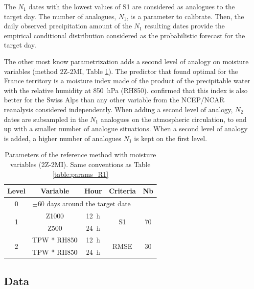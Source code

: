 \documentclass[5p]{elsarticle}
\begin{document}
The $N_{1}$ dates with the lowest values of S1 are considered as analogues to the target day. The number of analogues, $N_{1}$, is a parameter to calibrate. Then, the daily observed precipitation amount of the $N_{1}$ resulting dates provide the empirical conditional distribution considered as the probabilistic forecast for the target day.

The other most know parametrization adds a second level of analogy on moisture variables (method 2Z-2MI, Table \ref{table:params_R2}). The predictor that \citet{Bontron2004} found optimal for the France territory is a moisture index made of the product of the precipitable water with the relative humidity at 850~hPa (RH850). \cite{Horton2012a} confirmed that this index is also better for the Swiss Alps than any other variable from the NCEP/NCAR reanalysis considered independently. When adding a second level of analogy, $N_{2}$ dates are subsampled in the $N_{1}$ analogues on the atmospheric circulation, to end up with a smaller number of analogue situations. When a second level of analogy is added, a higher number of analogues $N_{1}$ is kept on the first level.

\begin{table}[htb]
	\caption{Parameters of the reference method with moisture variables (2Z-2MI). Same conventions as Table \ref{table:params_R1}}
	\footnotesize
	\begin{center}
		\begin{tabular}{ccccc}
			\hline 
			Level & Variable & Hour & Criteria & Nb \\ 
			\hline 
			0 & \multicolumn{4}{l}{$\pm 60$ days around the target date} \\
			\hline 
			\multirow{2}{*}{1} & Z1000 & 12~h & \multirow{2}{*}{S1} & \multirow{2}{*}{70} \\
			& Z500 & 24~h & & \\ 
			\hline
			\multirow{2}{*}{2} & TPW * RH850 & 12~h & \multirow{2}{*}{RMSE} & \multirow{2}{*}{30} \\
			& TPW * RH850 & 24~h & & \\ 
			\hline 
		\end{tabular} 
	\end{center}
	\label{table:params_R2}
\end{table}


\subsection{Data}
\label{sec:data}
\end{document}
